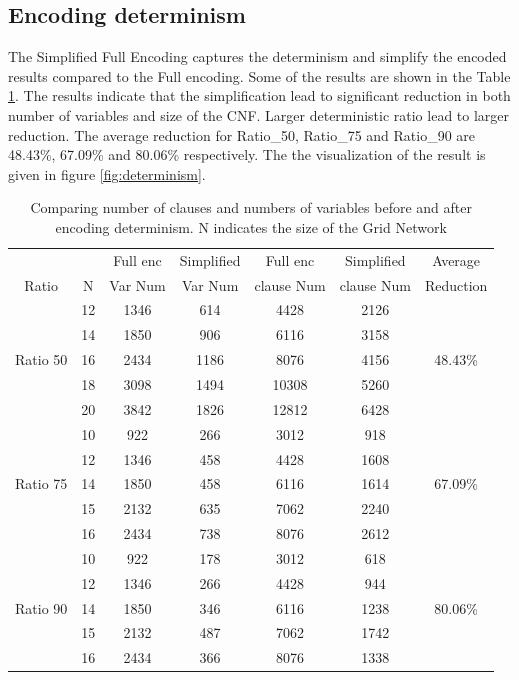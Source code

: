 \subsection{Encoding determinism}
The Simplified Full Encoding captures the determinism and simplify the encoded results compared to the Full encoding. Some of the results are shown in the Table \ref{tab:enc-determin}. The results indicate that the simplification lead to significant reduction in both number of variables and size of the CNF. Larger deterministic ratio lead to larger reduction. The average reduction for Ratio\_50, Ratio\_75 and Ratio\_90 are 48.43\%, 67.09\% and 80.06\% respectively. The the visualization of the result is given in figure \ref{fig:determinism}.
\begin{table}[]
    \centering
    \begin{tabular}{c c | c c  c c c }
        \hline
        &	&	Full enc	&	Simplified 	&	Full enc & Simplified &	Average\\
        Ratio & N	&   Var Num	&   Var Num	&	clause Num	& clause Num & 	Reduction\\
        \hline
        \hline
                &12	&	1346 	& 	614	&	 4428 	&	2126 &	\\
                &14	&	1850 	&	906	&	 6116 	&	3158 &	 \\
        Ratio 50&16	&	2434    &	1186	&	 8076 	&	4156 &	48.43\%\\
                &18	&	3098    &	1494	&	 10308 	&	5260 &	\\
                &20	&	3842 	&	1826	&	 12812 	&	6428 &	\\
        \hline
                &10	&	922	    &	266	&	3012	&	918 &	\\
                &12	&	1346	&	458	&	4428	&	1608 &	\\
       Ratio 75 &14	&	1850	&	458	&	6116	&	1614 & 67.09\%	\\
                &15	&	2132	&	635	&	7062	&	2240 &	\\
                &16	&	2434	&	738	&	8076	&	2612 &	\\
        \hline
                &10	&	922	    &	178	&	3012	&	618	& \\
                &12	&	1346	&	266	&	4428	&	944	& \\
        Ratio 90&14	&	1850	&	346	&	6116	&	1238 & 80.06\%	\\
                &15	&	2132	&	487	&	7062	&	1742 &	\\
                &16	&	2434	&	366	&	8076	&	1338 &	\\
        \hline
        \hline
    \end{tabular}
    \caption{Comparing number of clauses and numbers of variables before and after encoding determinism. N indicates the size of the Grid Network}
    \label{tab:enc-determin}
\end{table}

